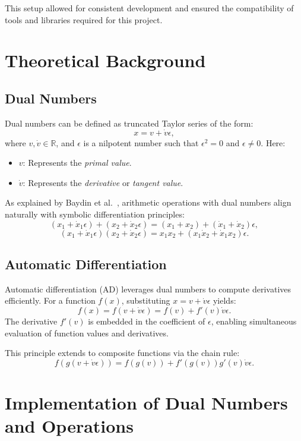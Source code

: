 \documentclass[a4paper,12pt]{article}
\begin{document}
This setup allowed for consistent development and ensured the compatibility of tools and libraries required for this project.

\section{Theoretical Background}

\subsection{Dual Numbers}
Dual numbers can be defined as truncated Taylor series of the form:
\[
x = v + \dot{v}\epsilon,
\]
where \(v, \dot{v} \in \mathbb{R}\), and \(\epsilon\) is a nilpotent number such that \(\epsilon^2 = 0\) and \(\epsilon \neq 0\). Here:
\begin{itemize}
    \item \(v\): Represents the \textit{primal value}.
    \item \(\dot{v}\): Represents the \textit{derivative} or \textit{tangent value}.
\end{itemize}

As explained by Baydin et al.~\cite{baydin2018automatic}, arithmetic operations with dual numbers align naturally with symbolic differentiation principles:
\[
(x_1 + \dot{x}_1\epsilon) + (x_2 + \dot{x}_2\epsilon) = (x_1 + x_2) + (\dot{x}_1 + \dot{x}_2)\epsilon,
\]
\[
(x_1 + \dot{x}_1\epsilon)(x_2 + \dot{x}_2\epsilon) = x_1x_2 + (x_1\dot{x}_2 + \dot{x}_1x_2)\epsilon.
\]

\subsection{Automatic Differentiation}
Automatic differentiation (AD) leverages dual numbers to compute derivatives efficiently. For a function \(f(x)\), substituting \(x = v + \dot{v}\epsilon\) yields:
\[
f(x) = f(v + \dot{v}\epsilon) = f(v) + f'(v)\dot{v}\epsilon.
\]
The derivative \(f'(v)\) is embedded in the coefficient of \(\epsilon\), enabling simultaneous evaluation of function values and derivatives.

This principle extends to composite functions via the chain rule:
\[
f(g(v + \dot{v}\epsilon)) = f(g(v)) + f'(g(v))g'(v)\dot{v}\epsilon.
\]

\section{Implementation of Dual Numbers and Operations}
\end{document}
